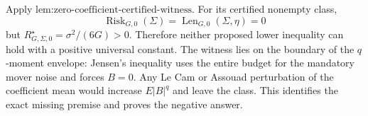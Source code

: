Apply \(\text{lem:zero-coefficient-certified-witness}\). For its certified nonempty class,
\[
\operatorname{Risk}_{G,0}(\Sigma)=\operatorname{Len}_{G,0}(\Sigma,\eta)=0
\]
but \(R_{G,\Sigma,0}^{\star}=\sigma^2/(6G)>0\). Therefore neither proposed lower inequality can hold with a positive universal constant. The witness lies on the boundary of the \(q\)-moment envelope: Jensen's inequality uses the entire budget for the mandatory mover noise and forces \(B=0\). Any Le Cam or Assouad perturbation of the coefficient mean would increase \(E|B|^q\) and leave the class. This identifies the exact missing premise and proves the negative answer.